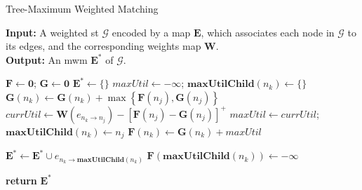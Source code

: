 \begin{algorithm}[tbp!]
\small
    \caption{Tree-Maximum Weighted Matching}
    \label{Alg:tmwm}
    \hspace*{\algorithmicindent} \textbf{Input:} A weighted \gls{st} $\mathcal{G}$ encoded by a map $\mathbf{E}$, which associates each node in $\mathcal{G}$ to its edges, and the corresponding weights map $\mathbf{W}$. \\ 
    \hspace*{\algorithmicindent} \textbf{Output:} An \gls{mwm} $\mathbf{E^*}$ of $\mathcal{G}$. 
    \begin{algorithmic}[1] %
            \State $\mathbf{F} \gets \mathbf{0}$; $\mathbf{G} \gets \mathbf{0}$ 
            \State $\mathbf{E^*} \gets \{ \}$ 
             
            \State $maxUtil \gets - \infty$;  $\mathbf{maxUtilChild}(n_k) \gets \{ \}$
             
                \State $\mathbf{G}(n_k) \gets \mathbf{G}(n_k) + \max \left\{ \mathbf{F}(n_j), \mathbf{G}(n_j) \right\}$
                \State $currUtil \gets \mathbf{W} ( e_{n_k \to n_j} ) - \left[ \mathbf{F}(n_j) - \mathbf{G}(n_j) \right]^+  $
            	\State $maxUtil \gets currUtil$;  $\mathbf{maxUtilChild}(n_k) \gets n_j$ 
            \EndIf
            \EndFor\label{edgesFor}
            \State $\mathbf{F}(n_k) \gets \mathbf{G}(n_k) + maxUtil$ 
            \EndFor\label{nodesFor}
			
			 			
			
					\State $\mathbf{E^*} \gets \mathbf{E^*} \cup e_{n_k \to \mathbf{maxUtilChild}(n_k)}$
					\State $\mathbf{F}(\mathbf{maxUtilChild}(n_k)) \gets -\infty$ 
				\EndIf\label{activeIf}
			\EndFor\label{edgesFor2}            
            
            \State \textbf{return} $\mathbf{E^*}$
        \EndProcedure
    \end{algorithmic}
\end{algorithm}

